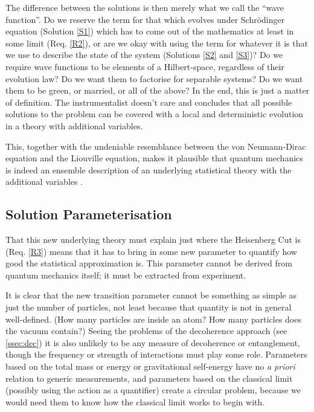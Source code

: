 \documentclass[superscriptaddress,floatfix,nofootinbib,12pt]{revtex4-2}
\begin{document}
The difference between the solutions is then merely what we call the ``wave function''. Do we reserve the term for that which evolves under Schr\"odinger equation (Solution \ref{S1}) which has to come out of the mathematics at least in some limit (Req. \ref{R2}), or are we okay with using the term for whatever it is that we use to describe the state of the system (Solutions \ref{S2} and \ref{S3})? Do we require wave functions to be elements of a Hilbert-space, regardless of their evolution law? Do we want them to factorise for separable systems? Do we want them to be green, or married, or all of the above? In the end, this is just a matter of definition. The instrumentalist doesn't care and concludes that all possible solutions to the problem can be covered with a local and deterministic evolution in a theory with additional variables. 

This, together with the undeniable resemblance between the von Neumann-Dirac equation and the Liouville equation, makes it plausible that quantum mechanics is indeed an ensemble description of an underlying statistical theory with the additional variables \cite{Hance2021Ensemble}. 

\subsection{Solution Parameterisation}
\label{ssec:para}

That this new underlying theory must explain just where the Heisenberg Cut is (Req. \ref{R3}) means that it has to bring in some new parameter to quantify how good the statistical approximation is. This parameter cannot be derived from quantum mechanics itself; it must be extracted from experiment. 

It is clear that the new transition parameter cannot be something as simple as just the number of particles, not least because that quantity is not in general well-defined. (How many particles are inside an atom? How many particles does the vacuum contain?) Seeing the problems of the decoherence approach (see \ref{ssec:dec}) it is also unlikely to be any measure of decoherence or entanglement, though the frequency or strength of interactions must play some role. Parameters based on the total mass or energy or gravitational self-energy have no \emph{a priori} relation to generic measurements, and parameters based on the classical limit (possibly using the action as a quantifier) create a circular problem, because we would need them to know how the classical limit works to begin with.
\end{document}
